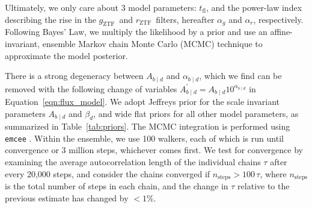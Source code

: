 \documentclass[twocolumn]{./aastex63}
\newcommand{\rztf}{$r_\mathrm{ZTF}$}
\newcommand{\gztf}{$g_\mathrm{ZTF}$}
\newcommand{\tfl}{$t_\mathrm{fl}$}
\begin{document}
Ultimately, we only care about 3 model parameters: \tfl, and the power-law
index describing the rise in the \gztf\ and \rztf\ filters, hereafter
$\alpha_g$ and $\alpha_r$, respectively. Following Bayes' Law, we multiply
the likelihood by a prior and use an affine-invariant, ensemble Markov chain
Monte Carlo (MCMC) technique \citep{Goodman10} to approximate the model
posterior. 

There is a strong degeneracy between $A_{b\mid d}$ and $\alpha_{b\mid d}$,
which we find can be removed with the following change of variables
$A^\prime_{b\mid d} = A_{b\mid d} 10^{\alpha_{b\mid d}}$ in
Equation~\ref{eqn:flux_model}. We adopt Jeffreys prior \citep{Jeffreys46} for
the scale invariant parameters $A_{b\mid d}$ and $\beta_d$, and wide flat
priors for all other model parameters, as summarized in
Table~\ref{tab:priors}. The MCMC integration is performed using
\texttt{emcee} \citep{Foreman-Mackey13}. Within the ensemble, we use 100
walkers, each of which is run until convergence or 3 million steps, whichever
comes first. We test for convergence by examining the average autocorrelation
length of the individual chains $\tau$ after every 20,000 steps, and consider
the chains converged if $n_\mathrm{steps} > 100 \,\tau$, where
$n_\mathrm{steps}$ is the total number of steps in each chain, and the change
in $\tau$ relative to the previous estimate has changed by $<1\%$.


\end{document}
